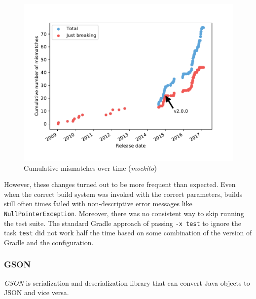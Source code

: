 \documentclass{l4proj}
\newcommand\genericstyle{\lstset{basicstyle=\ttm}}
\newcommand\codeinline[1]{{\genericstyle\lstinline!#1!}}
\begin{document}
\begin{figure}[]
\centering
\includegraphics[height=0.4\textheight]{images/evaluation/mockito_cumulative_mismatches}
\caption{Cumulative mismatches over time (\textit{mockito})}
\label{MockitoCumulativeMismatches}
\end{figure}

However, these changes turned out to be more frequent than expected.
Even when the correct build system was invoked with the correct
parameters, builds still often times failed with non-descriptive error
messages like \codeinline{NullPointerException}. Moreover, there was
no consistent way to skip running the test suite. The standard Gradle
approach of passing \codeinline{-x test} to ignore the task
\codeinline{test} did not work half the time based on some combination
of the version of Gradle and the configuration.

\subsubsection{GSON}

\textit{GSON} is serialization and deserialization library that
can convert Java objects to JSON and vice versa.
\end{document}

